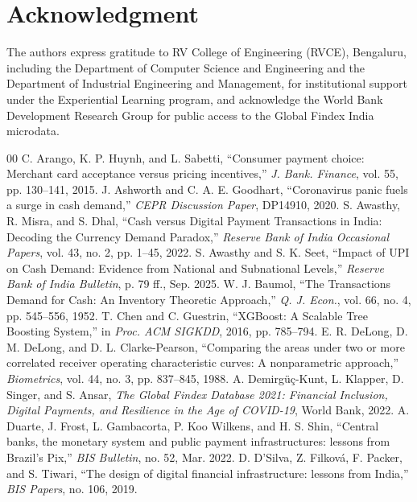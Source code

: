 \documentclass[conference]{IEEEtran}
\begin{document}
\section*{Acknowledgment}
The authors express gratitude to RV College of Engineering (RVCE), Bengaluru, including the Department of Computer Science and Engineering and the Department of Industrial Engineering and Management, for institutional support under the Experiential Learning program, and acknowledge the World Bank Development Research Group for public access to the Global Findex India microdata.


\begin{thebibliography}{00}
 C. Arango, K. P. Huynh, and L. Sabetti, ``Consumer payment choice: Merchant card acceptance versus pricing incentives,'' \textit{J. Bank. Finance}, vol. 55, pp. 130--141, 2015.
 J. Ashworth and C. A. E. Goodhart, ``Coronavirus panic fuels a surge in cash demand,'' \textit{CEPR Discussion Paper}, DP14910, 2020.
 S. Awasthy, R. Misra, and S. Dhal, ``Cash versus Digital Payment Transactions in India: Decoding the Currency Demand Paradox,'' \textit{Reserve Bank of India Occasional Papers}, vol. 43, no. 2, pp. 1--45, 2022.
 S. Awasthy and S. K. Seet, ``Impact of UPI on Cash Demand: Evidence from National and Subnational Levels,'' \textit{Reserve Bank of India Bulletin}, p. 79 ff., Sep. 2025.
 W. J. Baumol, ``The Transactions Demand for Cash: An Inventory Theoretic Approach,'' \textit{Q. J. Econ.}, vol. 66, no. 4, pp. 545--556, 1952.
 T. Chen and C. Guestrin, ``XGBoost: A Scalable Tree Boosting System,'' in \textit{Proc. ACM SIGKDD}, 2016, pp. 785--794.
 E. R. DeLong, D. M. DeLong, and D. L. Clarke-Pearson, ``Comparing the areas under two or more correlated receiver operating characteristic curves: A nonparametric approach,'' \textit{Biometrics}, vol. 44, no. 3, pp. 837--845, 1988.
 A. Demirg{\"u}{\c{c}}-Kunt, L. Klapper, D. Singer, and S. Ansar, \textit{The Global Findex Database 2021: Financial Inclusion, Digital Payments, and Resilience in the Age of COVID-19}, World Bank, 2022.
 A. Duarte, J. Frost, L. Gambacorta, P. Koo Wilkens, and H. S. Shin, ``Central banks, the monetary system and public payment infrastructures: lessons from Brazil's Pix,'' \textit{BIS Bulletin}, no. 52, Mar. 2022.
 D. D'Silva, Z. Filkov{\'a}, F. Packer, and S. Tiwari, ``The design of digital financial infrastructure: lessons from India,'' \textit{BIS Papers}, no. 106, 2019.

\end{thebibliography}
\end{document}
